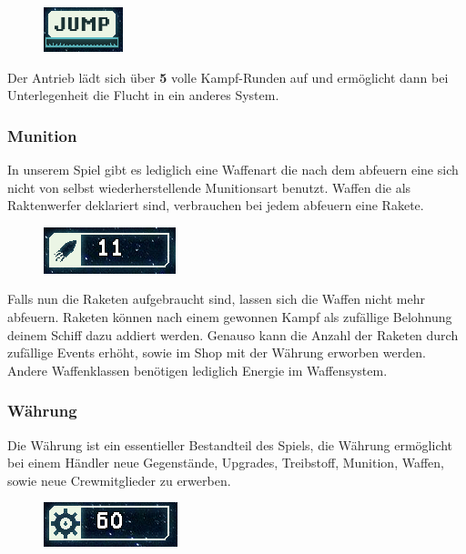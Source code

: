 \documentclass[fontsize=12pt,paper=a4,twoside]{scrartcl}
\begin{document}
\begin{figure}[H]
\centering
\includegraphics[width=0.4\linewidth]{DasSpiel/Ui/ftl_charge_combat.png}
\end{figure}
Der Antrieb lädt sich über \textbf{5} volle Kampf-Runden auf und ermöglicht dann bei Unterlegenheit die Flucht in ein anderes System.

\subsubsection{Munition}
In unserem Spiel gibt es lediglich eine Waffenart die nach dem abfeuern eine sich nicht von selbst wiederherstellende Munitionsart benutzt. Waffen die als Raktenwerfer deklariert sind, verbrauchen bei jedem abfeuern eine Rakete.

\begin{figure}[H]
\centering
\includegraphics[width=0.4\linewidth]{DasSpiel/Ui/Rocket.png}
\end{figure}

Falls nun die Raketen aufgebraucht sind, lassen sich die Waffen nicht mehr abfeuern. Raketen können nach einem gewonnen Kampf als zufällige Belohnung deinem Schiff dazu addiert werden. Genauso kann die Anzahl der Raketen durch zufällige Events erhöht, sowie im Shop mit der Währung erworben werden. Andere Waffenklassen benötigen lediglich Energie im Waffensystem.

\subsubsection{Währung}
Die Währung ist ein essentieller Bestandteil des Spiels, die Währung ermöglicht bei einem Händler neue Gegenstände, Upgrades, Treibstoff, Munition, Waffen, sowie neue Crewmitglieder zu erwerben.  

\begin{figure}[H]
\centering
\includegraphics[width=0.4\linewidth]{DasSpiel/Ui/Money.png}
\end{figure}
\end{document}
